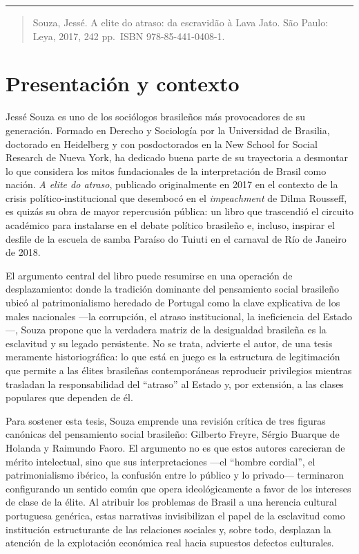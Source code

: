 \bigskip
\noindent\rule{\linewidth}{0.4pt}
\bigskip


\begin{quote}
Souza, Jessé. A elite do atraso: da escravidão à Lava Jato. São Paulo: Leya, 2017, 242 pp. ISBN 978-85-441-0408-1.

\end{quote}

\section{Presentación y contexto}
Jessé Souza es uno de los sociólogos brasileños más provocadores de su generación. Formado en Derecho y Sociología por la Universidad de Brasilia, doctorado en Heidelberg y con posdoctorados en la New School for Social Research de Nueva York, ha dedicado buena parte de su trayectoria a desmontar lo que considera los mitos fundacionales de la interpretación de Brasil como nación. \textit{A elite do atraso}, publicado originalmente en 2017 en el contexto de la crisis político-institucional que desembocó en el \textit{impeachment} de Dilma Rousseff, es quizás su obra de mayor repercusión pública: un libro que trascendió el circuito académico para instalarse en el debate político brasileño e, incluso, inspirar el desfile de la escuela de samba Paraíso do Tuiuti en el carnaval de Río de Janeiro de 2018.

El argumento central del libro puede resumirse en una operación de desplazamiento: donde la tradición dominante del pensamiento social brasileño ubicó al patrimonialismo heredado de Portugal como la clave explicativa de los males nacionales —la corrupción, el atraso institucional, la ineficiencia del Estado—, Souza propone que la verdadera matriz de la desigualdad brasileña es la esclavitud y su legado persistente. No se trata, advierte el autor, de una tesis meramente historiográfica: lo que está en juego es la estructura de legitimación que permite a las élites brasileñas contemporáneas reproducir privilegios mientras trasladan la responsabilidad del “atraso” al Estado y, por extensión, a las clases populares que dependen de él.

Para sostener esta tesis, Souza emprende una revisión crítica de tres figuras canónicas del pensamiento social brasileño: Gilberto Freyre, Sérgio Buarque de Holanda y Raimundo Faoro. El argumento no es que estos autores carecieran de mérito intelectual, sino que sus interpretaciones —el “hombre cordial”, el patrimonialismo ibérico, la confusión entre lo público y lo privado— terminaron configurando un sentido común que opera ideológicamente a favor de los intereses de clase de la élite. Al atribuir los problemas de Brasil a una herencia cultural portuguesa genérica, estas narrativas invisibilizan el papel de la esclavitud como institución estructurante de las relaciones sociales y, sobre todo, desplazan la atención de la explotación económica real hacia supuestos defectos culturales.

